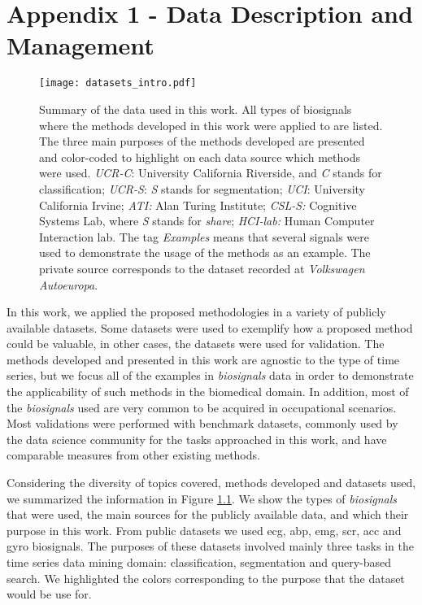 

\chapter{Appendix 1 - Data Description and Management}
\label{appendix:dataset}

\begin{figure}
\centering
\texttt{[image: datasets\_intro.pdf]}
\caption{Summary of the data used in this work. All types of biosignals where the methods developed in this work were applied to are listed. The three main purposes of the methods developed are presented and color-coded to highlight on each data source which methods were used. \textit{UCR-C}: University California Riverside, and \textit{C} stands for classification; \textit{UCR-S}: \textit{S} stands for segmentation; \textit{UCI}: University California Irvine; \textit{ATI:} Alan Turing Institute; \textit{CSL-S:} Cognitive Systems Lab, where \textit{S} stands for \textit{share}; \textit{HCI-lab:} Human Computer Interaction lab. The tag \textit{Examples} means that several signals were used to demonstrate the usage of the methods as an example. The private source corresponds to the dataset recorded at \textit{Volkswagen Autoeuropa}.}
\label{fig:intro_datasets}
\end{figure}

In this work, we applied the proposed methodologies in a variety of publicly available datasets. Some datasets were used to exemplify how a proposed method could be valuable, in other cases, the datasets were used for validation. The methods developed and presented in this work are agnostic to the type of time series, but we focus all of the examples in \textit{biosignals} data in order to demonstrate the applicability of such methods in the biomedical domain. In addition, most of the \textit{biosignals} used are very common to be acquired in occupational scenarios. Most validations were performed with benchmark datasets, commonly used by the data science community for the tasks approached in this work, and have comparable measures from other existing methods.

Considering the diversity of topics covered, methods developed and datasets used, we summarized the information in Figure \ref{fig:intro_datasets}. We show the types of \textit{biosignals} that were used, the main sources for the publicly available data, and which their purpose in this work. From public datasets we used \gls{ecg}, \gls{abp}, \gls{emg}, \gls{scr}, \gls{acc} and \gls{gyro} biosignals. The purposes of these datasets involved mainly three tasks in the time series data mining domain: classification, segmentation and query-based search. We highlighted the colors corresponding to the purpose that the dataset would be use for. 


